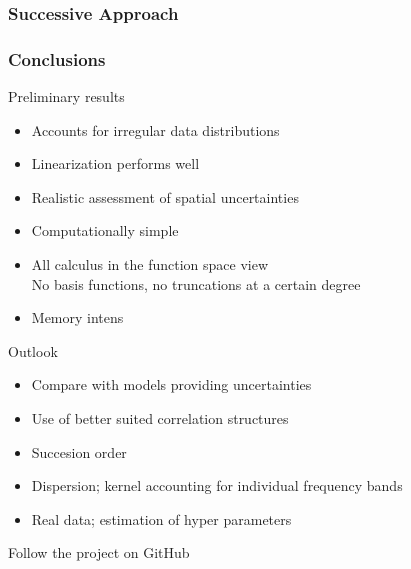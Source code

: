 \documentclass[aspectratio=169, t, 10pt]{beamer}
\begin{document}
\begin{frame}
    \frametitle{Successive Approach}
    \begin{center}
    \end{center}
\end{frame}


\begin{frame}
    \frametitle{Conclusions}

    Preliminary results
    \begin{itemize}
        \item Accounts for irregular data distributions
        \item Linearization performs well
        \item Realistic assessment of spatial uncertainties
        \item Computationally simple
        \item All calculus in the function space view \\
              No basis functions, no truncations at a certain degree
        \item Memory intens
    \end{itemize}
    \medskip

    Outlook
    \begin{itemize}
        \item Compare with models providing uncertainties
        \item Use of better suited correlation structures
        \item Succesion order
        \item Dispersion;
            kernel accounting for individual frequency bands
        \item Real data;
            estimation of hyper parameters
    \end{itemize}

\end{frame}

\begin{frame}
    \hspace{15mm} Follow the project on GitHub \\[1cm]
    \hfill {} \hspace{20mm}
\end{frame}
\end{document}
